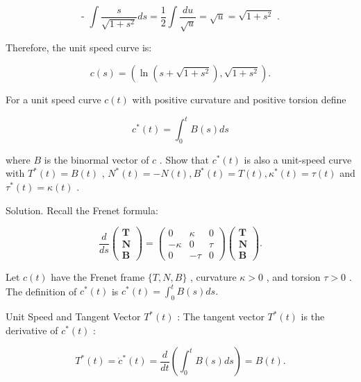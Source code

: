 \documentclass[10pt]{article}
\begin{document}
\[
\text{ - }\int \frac{s}{\sqrt{1 + {s}^{2}}}{ds} = \frac{1}{2}\int \frac{du}{\sqrt{u}} = \sqrt{u} = \sqrt{1 + {s}^{2}}\text{ . }
\]

Therefore, the unit speed curve is:

\[
c\left( s\right)  = \left( {\ln \left( {s + \sqrt{1 + {s}^{2}}}\right) ,\sqrt{1 + {s}^{2}}}\right) .
\]

\begin{problem}[title=PROBLEM 7 (4 POINTS)]
For a unit speed curve \(c\left( t\right)\) with positive curvature and positive torsion define

\[
{c}^{ * }\left( t\right)  = {\int }_{0}^{t}B\left( s\right) {ds}
\]

where \(B\) is the binormal vector of \(c\) . Show that \({c}^{ * }\left( t\right)\) is also a unit-speed curve with \({T}^{ * }\left( t\right)  = B\left( t\right)\) , \({N}^{ * }\left( t\right)  =  - N\left( t\right) ,{B}^{ * }\left( t\right)  = T\left( t\right) ,{\kappa }^{ * }\left( t\right)  = \tau \left( t\right)\) and \({\tau }^{ * }\left( t\right)  = \kappa \left( t\right)\) .
\end{problem}

Solution. Recall the Frenet formula:

\[
\frac{d}{ds}\left( \begin{array}{l} \mathbf{T} \\  \mathbf{N} \\  \mathbf{B} \end{array}\right)  = \left( \begin{matrix} 0 & \kappa & 0 \\   - \kappa & 0 & \tau \\  0 &  - \tau & 0 \end{matrix}\right) \left( \begin{array}{l} \mathbf{T} \\  \mathbf{N} \\  \mathbf{B} \end{array}\right) .
\]

Let \(c\left( t\right)\) have the Frenet frame \(\{ T,N,B\}\) , curvature \(\kappa  > 0\) , and torsion \(\tau  > 0\) . The definition of \({c}^{ * }\left( t\right)\) is \({c}^{ * }\left( t\right)  = {\int }_{0}^{t}B\left( s\right) {ds}.\)

Unit Speed and Tangent Vector \({T}^{ * }\left( t\right)\) : The tangent vector \({T}^{ * }\left( t\right)\) is the derivative of \({c}^{ * }\left( t\right)\) :

\[
{T}^{ * }\left( t\right)  = {\dot{c}}^{ * }\left( t\right)  = \frac{d}{dt}\left( {{\int }_{0}^{t}B\left( s\right) {ds}}\right)  = B\left( t\right) .
\]
\end{document}
